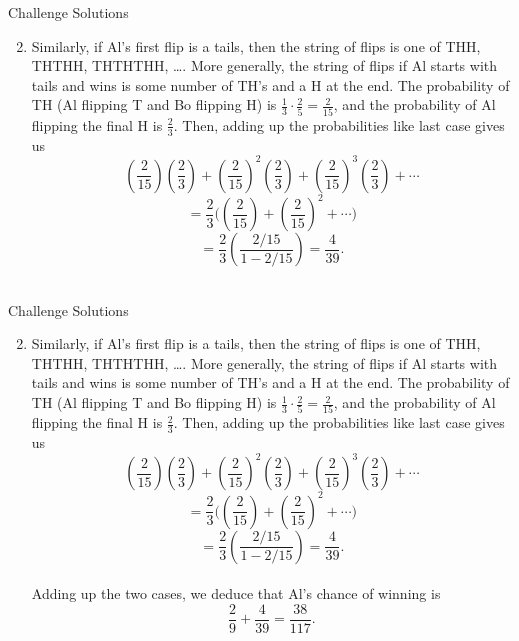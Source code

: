 \documentclass[9pt]{beamer}
\begin{document}
\begin{frame}[t]{Challenge Solutions}
    \begin{enumerate}
    \setcounter{enumi}{1}
        \item Similarly, if Al's first flip is a tails, then the string of flips is one of THH, THTHH, THTHTHH, \ldots. More generally, the string of flips if Al starts with tails and wins is some number of TH's and a H at the end. The probability of TH (Al flipping T and Bo flipping H) is $\frac{1}{3}\cdot\frac{2}{5}=\frac{2}{15}$, and the probability of Al flipping the final H is $\frac{2}{3}$. Then, adding up the probabilities like last case gives us
        $$\left(\frac{2}{15}\right)\left(\frac{2}{3}\right)+\left(\frac{2}{15}\right)^2\left(\frac{2}{3}\right)+\left(\frac{2}{15}\right)^3\left(\frac{2}{3}\right)+\cdots$$
        $$=\frac{2}{3}\bigg(\left(\frac{2}{15}\right)+\left(\frac{2}{15}\right)^2+\cdots\bigg)$$
        $$=\frac{2}{3}\left(\frac{2/15}{1-2/15}\right)=\frac{4}{39}.$$\\
        \bigskip
        
    \end{enumerate}
    
\end{frame}



\begin{frame}[t]{Challenge Solutions}
    \begin{enumerate}
    \setcounter{enumi}{1}
        \item Similarly, if Al's first flip is a tails, then the string of flips is one of THH, THTHH, THTHTHH, \ldots. More generally, the string of flips if Al starts with tails and wins is some number of TH's and a H at the end. The probability of TH (Al flipping T and Bo flipping H) is $\frac{1}{3}\cdot\frac{2}{5}=\frac{2}{15}$, and the probability of Al flipping the final H is $\frac{2}{3}$. Then, adding up the probabilities like last case gives us
        $$\left(\frac{2}{15}\right)\left(\frac{2}{3}\right)+\left(\frac{2}{15}\right)^2\left(\frac{2}{3}\right)+\left(\frac{2}{15}\right)^3\left(\frac{2}{3}\right)+\cdots$$
        $$=\frac{2}{3}\bigg(\left(\frac{2}{15}\right)+\left(\frac{2}{15}\right)^2+\cdots\bigg)$$
        $$=\frac{2}{3}\left(\frac{2/15}{1-2/15}\right)=\frac{4}{39}.$$\\
        \bigskip
        Adding up the two cases, we deduce that Al's chance of winning is $$\frac{2}{9}+\frac{4}{39}=\frac{38}{117}.$$
    \end{enumerate}
    
\end{frame}
\end{document}
